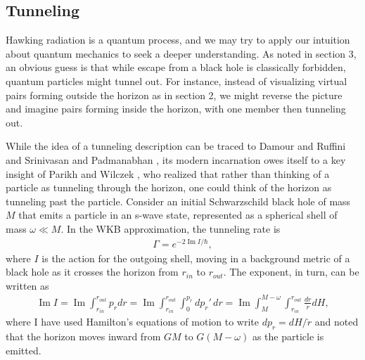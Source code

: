 \documentclass[12pt]{article}
\begin{document}
\subsection{Tunneling \label{Tunna}}

Hawking radiation is a quantum process, and we may try to apply our
intuition about quantum mechanics to seek a deeper understanding. 
As noted in section 3, an obvious guess is that while escape 
from a black hole is classically forbidden, quantum particles might
tunnel out.  For instance, instead of visualizing virtual pairs forming
outside the horizon as in section 2, we might reverse the 
picture and imagine pairs forming inside the horizon, with 
one member then tunneling out.

While the idea of a tunneling description can be traced to Damour and
Ruffini \cite{Damour} and Srinivasan and Padmanabhan \cite{SriPad}, 
its modern incarnation owes itself to a key insight
of Parikh and Wilczek \cite{Parikh}, who realized that rather than 
thinking of a particle as tunneling through the horizon, one could think 
of the horizon as tunneling past the particle.  
Consider an initial Schwarzschild black hole of mass $M$ that emits
a particle in an s-wave state, represented as a spherical shell of mass
$\omega \ll M$.  In the WKB approximation, the tunneling rate is
\begin{align}
\Gamma = e^{-2\mathop{Im} I/\hbar}  ,
\label{Carlipe3}
\end{align}
where $I$ is the action for the outgoing shell, moving in a background
metric of a black hole as it crosses the horizon from
$r_{\scriptscriptstyle\mathit{in}}$ to $r_{\scriptscriptstyle\mathit{out}}$.
The exponent, in turn, can be written as
\begin{align}
\mathop{Im} I = 
\mathop{Im}
\int_{r_{\scriptscriptstyle\mathit{in}}}^{r_{\scriptscriptstyle\mathit{out}}}
p_r dr = 
\mathop{Im}
\int_{r_{\scriptscriptstyle\mathit{in}}}^{r_{\scriptscriptstyle\mathit{out}}}
\int_0^{p_r}dp_r'\,dr =
\mathop{Im}\int_M^{M-\omega} 
\int_{r_{\scriptscriptstyle\mathit{in}}}^{r_{\scriptscriptstyle\mathit{out}}}
\frac{dr}{{\dot r}}dH ,
\label{Carlipe4}
\end{align}
where I have used Hamilton's equations of motion to write 
$dp_r = dH/{\dot r}$ and noted that the horizon moves inward from 
$GM$ to $G(M-\omega)$ as the particle is emitted.
\end{document}
